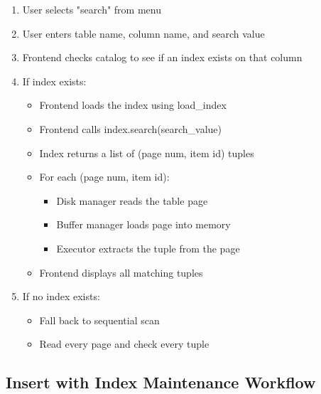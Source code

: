 \documentclass[11pt,a4paper]{article}
\begin{document}
\begin{enumerate}
\item User selects "search" from menu
\item User enters table name, column name, and search value
\item Frontend checks catalog to see if an index exists on that column
\item If index exists:
    \begin{itemize}
    \item Frontend loads the index using load\_index
    \item Frontend calls index.search(search\_value)
    \item Index returns a list of (page num, item id) tuples
    \item For each (page num, item id):
        \begin{itemize}
        \item Disk manager reads the table page
        \item Buffer manager loads page into memory
        \item Executor extracts the tuple from the page
        \end{itemize}
    \item Frontend displays all matching tuples
    \end{itemize}
\item If no index exists:
    \begin{itemize}
    \item Fall back to sequential scan
    \item Read every page and check every tuple
    \end{itemize}
\end{enumerate}

\subsection{Insert with Index Maintenance Workflow}
\end{document}
